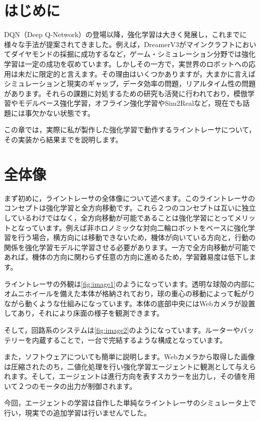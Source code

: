 \section{はじめに}
DQN（Deep Q-Network\cite{mnih2013playing}）の登場以降，強化学習は大きく発展し，これまでに様々な手法が提案されてきました。例えば，DreamerV3\cite{hafner2024masteringdiversedomainsworld}がマインクラフトにおいてダイヤモンドの採掘に成功するなど，ゲーム・シミュレーション分野では強化学習は一定の成功を収めています。しかしその一方で，実世界のロボットへの応用は未だに限定的と言えます。その理由はいくつかありますが，大まかに言えばシミュレーションと現実のギャップ，データ効率の問題，リアルタイム性の問題があります。それらの課題に対処するための研究も活発に行われており，模倣学習やモデルベース強化学習，オフライン強化学習やSim2Realなど，現在でも話題には事欠かない状態です。

この章では，実際に私が製作した強化学習で動作するライントレーサについて，その実装から結果までを説明します。

\section{全体像}
まず初めに，ライントレーサの全体像について述べます。このライントレーサのコンセプトは強化学習と全方向移動です。これら２つのコンセプトは互いに独立しているわけではなく，全方向移動が可能であることは強化学習にとってメリットとなっています。例えば非ホロノミックな対向二輪ロボットをベースに強化学習を行う場合，横方向には移動できないため，機体が向いている方向と，行動の関係を強化学習モデルに学習させる必要があります。一方で全方向移動が可能であれば，機体の方向に関わらず任意の方向に進めるため，学習難易度は低下します。

ライントレーサの外観は\ref{fig:image1}のようになっています。透明な球殻の内部にオムニホイールを備えた本体が格納されており，球の重心の移動によって転がりながら動くような仕組みになっています。本体の底部中央にはWebカメラが設置してあり，それにより床面の様子を観測できます。

そして，回路系のシステムは\ref{fig:image2}のようになっています。ルーターやバッテリーを内蔵することで，一台で完結するような構成となっています。

また，ソフトウェアについても簡単に説明します。Webカメラから取得した画像は圧縮されたのち，二値化処理を行い強化学習エージェントに観測として与えられます。そして，エージェントは進行方向を表すスカラーを出力し，その値を用いて２つのモータの出力が制御されます。

今回，エージェントの学習は自作した単純なライントレーサのシミュレータ上で行い，現実での追加学習は行いませんでした。

